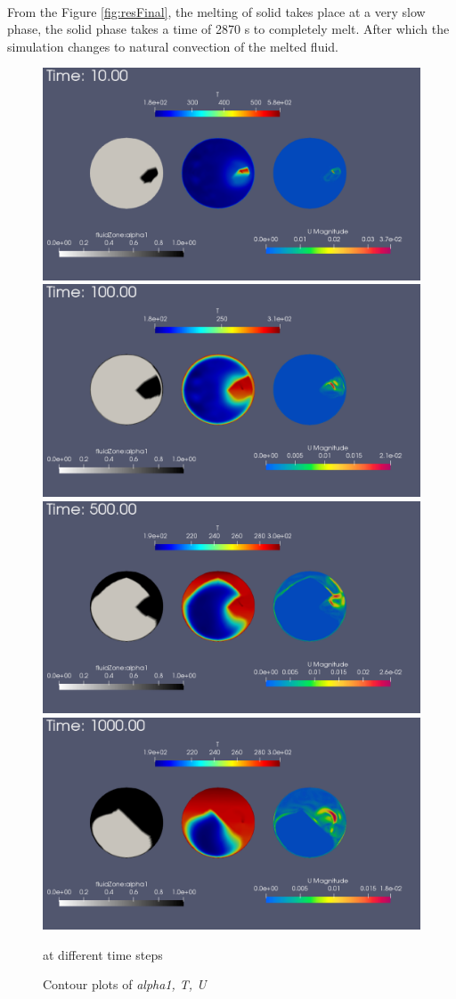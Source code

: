 \documentclass{article}
\begin{document}
    \paragraph*{}
    From the Figure \ref{fig:resFinal}, the melting of solid takes place at a very slow phase, the solid phase takes a time of 2870 s to completely melt. After which the simulation changes to natural convection of the melted fluid.
    \begin{figure}[ht]
        \centering
        
        \includegraphics[width=0.65\linewidth]{time10.png}
        \includegraphics[width=0.65\linewidth]{time100.png}
        \includegraphics[width=0.65\linewidth]{time500.png}
        \includegraphics[width=0.65\linewidth]{time1000.png}
        \caption{Contour plots of \textsl{alpha1, T, U}} at different time steps
        \label{fig:res0-1000}
    \end{figure}
    
\end{document}
